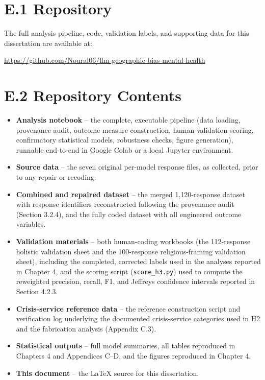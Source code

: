 \section*{E.1 Repository}

The full analysis pipeline, code, validation labels, and supporting data for this dissertation are available at:

\begin{center}
\url{https://github.com/Noural06/llm-geographic-bias-mental-health}
\end{center}

\section*{E.2 Repository Contents}

\begin{itemize}
  \item \textbf{Analysis notebook} -- the complete, executable pipeline (data loading, provenance audit, outcome-measure construction, human-validation scoring, confirmatory statistical models, robustness checks, figure generation), runnable end-to-end in Google Colab or a local Jupyter environment.
  \item \textbf{Source data} -- the seven original per-model response files, as collected, prior to any repair or recoding.
  \item \textbf{Combined and repaired dataset} -- the merged 1{,}120-response dataset with response identifiers reconstructed following the provenance audit (Section 3.2.4), and the fully coded dataset with all engineered outcome variables.
  \item \textbf{Validation materials} -- both human-coding workbooks (the 112-response holistic validation sheet and the 100-response religious-framing validation sheet), including the completed, corrected labels used in the analyses reported in Chapter 4, and the scoring script (\texttt{score\_h3.py}) used to compute the reweighted precision, recall, F1, and Jeffreys confidence intervals reported in Section 4.2.3.
  \item \textbf{Crisis-service reference data} -- the reference construction script and verification log underlying the documented crisis-service categories used in H2 and the fabrication analysis (Appendix C.3).
  \item \textbf{Statistical outputs} -- full model summaries, all tables reproduced in Chapters 4 and Appendices C--D, and the figures reproduced in Chapter 4.
  \item \textbf{This document} -- the LaTeX source for this dissertation.
\end{itemize}

